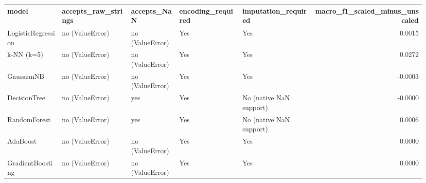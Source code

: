 \begin{tabular}{lllllr}
\toprule
model & accepts\_raw\_strings & accepts\_NaN & encoding\_required & imputation\_required & macro\_f1\_scaled\_minus\_unscaled \\
\midrule
LogisticRegression & no (ValueError) & no (ValueError) & Yes & Yes & 0.0015 \\
k-NN (k=5) & no (ValueError) & no (ValueError) & Yes & Yes & 0.0272 \\
GaussianNB & no (ValueError) & no (ValueError) & Yes & Yes & -0.0003 \\
DecisionTree & no (ValueError) & yes & Yes & No (native NaN support) & -0.0000 \\
RandomForest & no (ValueError) & yes & Yes & No (native NaN support) & 0.0006 \\
AdaBoost & no (ValueError) & no (ValueError) & Yes & Yes & 0.0000 \\
GradientBoosting & no (ValueError) & no (ValueError) & Yes & Yes & 0.0000 \\
\bottomrule
\end{tabular}
